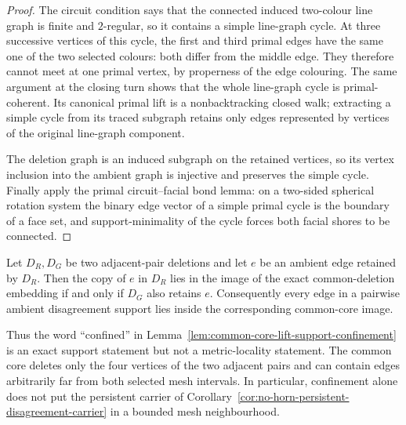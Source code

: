 \begin{proof}
The circuit condition says that the connected induced two-colour line graph
is finite and $2$-regular, so it contains a simple line-graph cycle.  At
three successive vertices of this cycle, the first and third primal edges
have the same one of the two selected colours: both differ from the middle
edge.  They therefore cannot meet at one primal vertex, by properness of the
edge colouring.  The same argument at the closing turn shows that the whole
line-graph cycle is primal-coherent.  Its canonical primal lift is a
nonbacktracking closed walk; extracting a simple cycle from its traced
subgraph retains only edges represented by vertices of the original
line-graph component.

The deletion graph is an induced subgraph on the retained vertices, so its
vertex inclusion into the ambient graph is injective and preserves the
simple cycle.  Finally apply the primal circuit--facial bond lemma: on a
two-sided spherical rotation system the binary edge vector of a simple
primal cycle is the boundary of a face set, and support-minimality of the
cycle forces both facial shores to be connected.
\end{proof}

\begin{lemma}
\label{lem:common-core-confinement-scope}
Let $D_R,D_G$ be two adjacent-pair deletions and let $e$ be an ambient
edge retained by $D_R$.  Then the copy of $e$ in $D_R$ lies in the
image of the exact common-deletion embedding if and only if $D_G$ also
retains $e$.  Consequently every edge in a pairwise ambient disagreement
support lies inside the corresponding common-core image.

Thus the word ``confined'' in
Lemma~\ref{lem:common-core-lift-support-confinement} is an exact support
statement but not a metric-locality statement.  The common core deletes only
the four vertices of the two adjacent pairs and can contain edges arbitrarily
far from both selected mesh intervals.  In particular, confinement alone
does not put the persistent carrier of
Corollary~\ref{cor:no-horn-persistent-disagreement-carrier} in a bounded
mesh neighbourhood.
\end{lemma}

